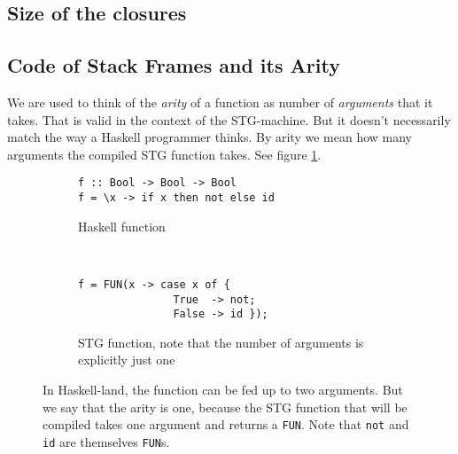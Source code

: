 \subsection{Size of the closures}








\subsection{Code of Stack Frames and its Arity}

We are used to think of the \emph{arity} of a function as number
of \emph{arguments} that it takes. That is valid in the context of the
STG-machine. But it doesn't necessarily match the way a Haskell
programmer thinks. By arity we mean how many arguments the compiled
STG function takes. See figure \ref{fig:tricky_arity}. \cite{commentary_function_calls}

\begin{figure}
\begin{mdframed}
        \begin{subfigure}[t]{0.5\textwidth}
          \begin{verbatim}
f :: Bool -> Bool -> Bool
f = \x -> if x then not else id
          \end{verbatim}
          \caption{Haskell function}
        \end{subfigure}
    ~ %
        \begin{subfigure}[t]{0.5\textwidth}
          \begin{verbatim}
f = FUN(x -> case x of {
               True  -> not;
               False -> id });
          \end{verbatim}
          \caption{STG function, note that the number of arguments is
explicitly just one}
        \end{subfigure}
  \caption{In Haskell-land, the function can be fed up to two arguments.
  But we say that the arity is one, because the STG function that will be
  compiled takes one argument and returns a \texttt{FUN}. Note that \texttt{not}
  and \texttt{id} are themselves \texttt{FUN}s.
 }
  \label{fig:tricky_arity}
\end{mdframed}
\end{figure}

